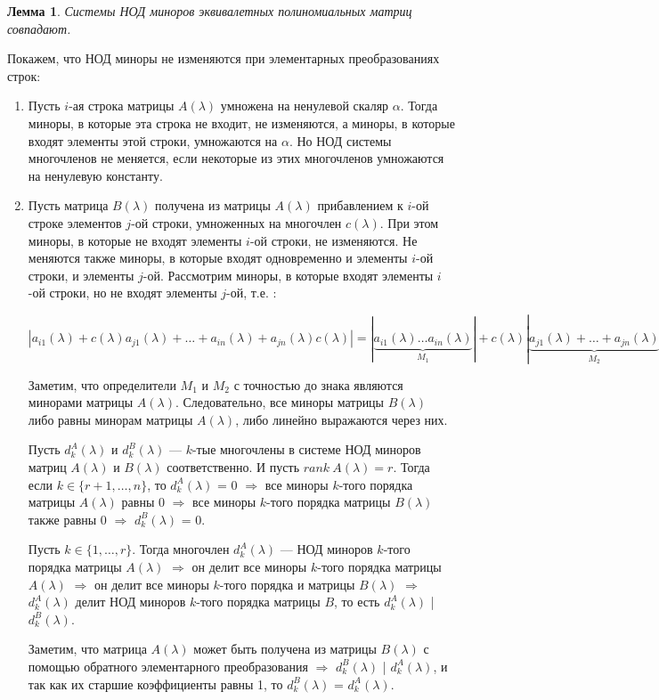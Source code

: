 \newtheorem*{lem12_2_1}{Лемма}\begin{lem12_2_1}Системы НОД миноров эквивалетных полиномиальных матриц совпадают.
\end{lem12_2_1}\begin{Proof}
	Покажем, что НОД миноры не изменяются при элементарных преобразованиях строк:
	\begin{enumerate}
		\item Пусть $i$-ая строка матрицы $A(\lambda)$ умножена на ненулевой скаляр $\alpha$. Тогда миноры, в которые эта строка не входит, не изменяются, а миноры, в которые входят элементы этой строки, умножаются на $\alpha$. Но НОД системы многочленов не меняется, если некоторые из этих многочленов умножаются на ненулевую константу.
		\item Пусть матрица $B(\lambda)$ получена из матрицы $A(\lambda)$ прибавлением к $i$-ой строке элементов $j$-ой строки, умноженных на многочлен $c(\lambda)$. При этом миноры, в которые не входят элементы $i$-ой строки, не изменяются. Не меняются также миноры, в которые входят одновременно и элементы $i$-ой строки, и элементы $j$-ой. Рассмотрим миноры, в которые входят элементы $i$-ой строки, но не входят элементы $j$-ой, т.е. :
		
		$|a_{i1}(\lambda) + c(\lambda)a_{j1}(\lambda) + \ldots + a_{in}(\lambda) + a_{jn}(\lambda) c(\lambda)| = |\underbrace{a_{i1}(\lambda) \dots a_{in}(\lambda)}_{M_1}| + c(\lambda)|\underbrace{a_{j1}(\lambda) +\ldots + a_{jn}(\lambda)}_{M_2}| = M_1 + c(\lambda)M_2.$
		
		Заметим, что определители $M_1$ и $M_2$ с точностью до знака являются минорами матрицы $A(\lambda)$. Следовательно, все миноры матрицы $B(\lambda)$ либо равны минорам матрицы $A(\lambda)$, либо линейно выражаются через них.
		\par\bigskip
		
		Пусть $d^{A}_k (\lambda)$ и $d^{B}_k (\lambda)$ --- $k$-тые многочлены в системе НОД миноров матриц $A(\lambda)$ и $B(\lambda)$ соответственно. И пусть $rank \ A(\lambda) = r$. Тогда если $k \in \{r+1, \dots, n\}$, то $d^{A}_k (\lambda)$ = 0 $\Rightarrow$ все миноры $k$-того порядка матрицы $A(\lambda)$ равны 0 $\Rightarrow$ все миноры $k$-того порядка матрицы $B(\lambda)$ также равны 0 $\Rightarrow$ $d^{B}_k (\lambda)$ = 0.
		
		Пусть $k \in \{1, \dots, r\}$. Тогда многочлен $d^{A}_k (\lambda)$ --- НОД миноров $k$-того порядка матрицы $A(\lambda)$ $\Rightarrow$ он делит все миноры $k$-того порядка матрицы $A(\lambda)$ $\Rightarrow$ он делит все миноры $k$-того порядка и матрицы $B(\lambda)$ $\Rightarrow$ $d^{A}_k (\lambda)$ делит НОД миноров $k$-того порядка матрицы $B$, то есть $d^{A}_k (\lambda)$ | $d^{B}_k (\lambda)$.
		
		Заметим, что матрица $A(\lambda)$ может быть получена из матрицы $B(\lambda)$ с помощью обратного элементарного преобразования $\Rightarrow$ $d^{B}_k (\lambda)$ | $d^{A}_k (\lambda)$, и так как их старшие коэффициенты равны 1, то $d^{B}_k (\lambda)$ = $d^{A}_k (\lambda)$. \end{enumerate}
\end{Proof} 
